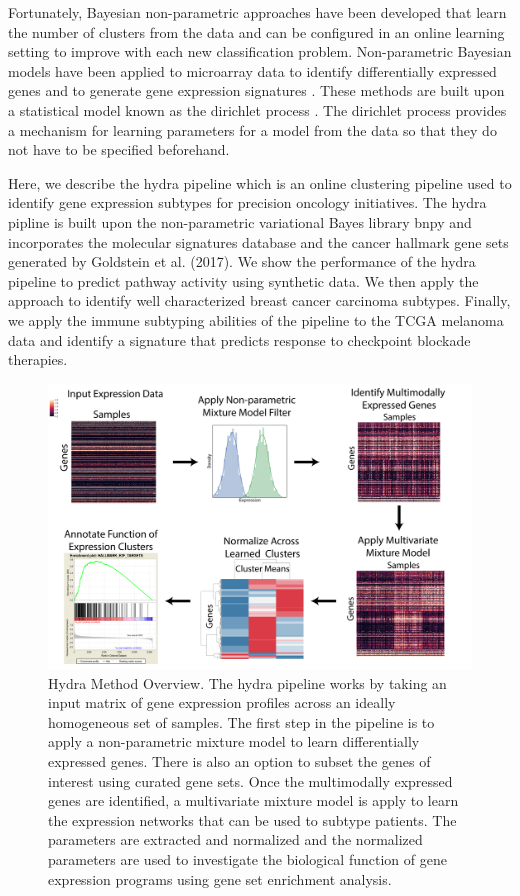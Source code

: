 \documentclass[fleqn,10pt]{wlscirep}
\begin{document}
Fortunately, Bayesian non-parametric approaches have been developed that learn the number of clusters from the data and can be configured in an online learning setting to improve with each new classification problem. Non-parametric Bayesian models have been applied to microarray data to identify differentially expressed genes and to generate gene expression signatures \cite{medvedovic2002bayesian,newton2004detecting}. These methods are built upon a statistical model known as the dirichlet process \cite{gelman2014bayesian}. The dirichlet process provides a mechanism for learning parameters for a model from the data so that they do not have to be specified beforehand. 

Here, we describe the hydra pipeline which is an online clustering pipeline used to identify gene expression subtypes for precision oncology initiatives. The hydra pipline is built upon the non-parametric variational Bayes library bnpy \cite{hughes2014bnpy} and incorporates the molecular signatures database \cite{liberzon2011molecular} and the cancer hallmark gene sets generated by Goldstein et al. (2017). We show the performance of the hydra pipeline to predict pathway activity using synthetic data. We then apply the approach to identify well characterized breast cancer carcinoma subtypes. Finally, we apply the immune subtyping abilities of the pipeline to the TCGA melanoma data and identify a signature that predicts response to checkpoint blockade therapies.

\begin{figure}
	\centering
	\includegraphics[width=0.75\linewidth]{images/hydra-overview@2x.png}
	\caption{Hydra Method Overview. The hydra pipeline works by taking an input matrix of gene expression profiles across an ideally homogeneous set of samples. The first step in the pipeline is to apply a non-parametric mixture model to learn differentially expressed genes. There is also an option to subset the genes of interest using curated gene sets. Once the multimodally expressed genes are identified, a multivariate mixture model is apply to learn the expression networks that can be used to subtype patients. The parameters are extracted and normalized and the normalized parameters are used to investigate the biological function of gene expression programs using gene set enrichment analysis.}
	\label{sfig:hydra-overview}
\end{figure}
\end{document}
